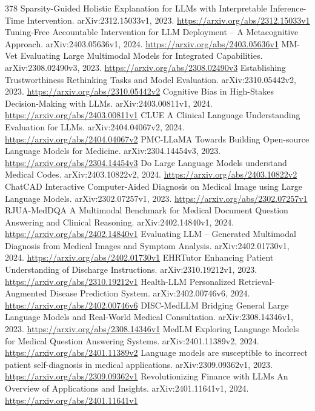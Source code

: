\documentclass[11pt]{article}
\begin{document}
\begin{thebibliography}{378}
 Sparsity-Guided Holistic Explanation for LLMs with Interpretable Inference-Time Intervention. arXiv:2312.15033v1, 2023. \url{https://arxiv.org/abs/2312.15033v1}
 Tuning-Free Accountable Intervention for LLM Deployment -- A Metacognitive Approach. arXiv:2403.05636v1, 2024. \url{https://arxiv.org/abs/2403.05636v1}
 MM-Vet Evaluating Large Multimodal Models for Integrated Capabilities. arXiv:2308.02490v3, 2023. \url{https://arxiv.org/abs/2308.02490v3}
 Establishing Trustworthiness Rethinking Tasks and Model Evaluation. arXiv:2310.05442v2, 2023. \url{https://arxiv.org/abs/2310.05442v2}
 Cognitive Bias in High-Stakes Decision-Making with LLMs. arXiv:2403.00811v1, 2024. \url{https://arxiv.org/abs/2403.00811v1}
 CLUE A Clinical Language Understanding Evaluation for LLMs. arXiv:2404.04067v2, 2024. \url{https://arxiv.org/abs/2404.04067v2}
 PMC-LLaMA Towards Building Open-source Language Models for Medicine. arXiv:2304.14454v3, 2023. \url{https://arxiv.org/abs/2304.14454v3}
 Do Large Language Models understand Medical Codes. arXiv:2403.10822v2, 2024. \url{https://arxiv.org/abs/2403.10822v2}
 ChatCAD Interactive Computer-Aided Diagnosis on Medical Image using Large Language Models. arXiv:2302.07257v1, 2023. \url{https://arxiv.org/abs/2302.07257v1}
 RJUA-MedDQA A Multimodal Benchmark for Medical Document Question Answering and Clinical Reasoning. arXiv:2402.14840v1, 2024. \url{https://arxiv.org/abs/2402.14840v1}
 Evaluating LLM -- Generated Multimodal Diagnosis from Medical Images and Symptom Analysis. arXiv:2402.01730v1, 2024. \url{https://arxiv.org/abs/2402.01730v1}
 EHRTutor Enhancing Patient Understanding of Discharge Instructions. arXiv:2310.19212v1, 2023. \url{https://arxiv.org/abs/2310.19212v1}
 Health-LLM Personalized Retrieval-Augmented Disease Prediction System. arXiv:2402.00746v6, 2024. \url{https://arxiv.org/abs/2402.00746v6}
 DISC-MedLLM Bridging General Large Language Models and Real-World Medical Consultation. arXiv:2308.14346v1, 2023. \url{https://arxiv.org/abs/2308.14346v1}
 MedLM Exploring Language Models for Medical Question Answering Systems. arXiv:2401.11389v2, 2024. \url{https://arxiv.org/abs/2401.11389v2}
 Language models are susceptible to incorrect patient self-diagnosis in medical applications. arXiv:2309.09362v1, 2023. \url{https://arxiv.org/abs/2309.09362v1}
 Revolutionizing Finance with LLMs An Overview of Applications and Insights. arXiv:2401.11641v1, 2024. \url{https://arxiv.org/abs/2401.11641v1}

\end{thebibliography}
\end{document}
